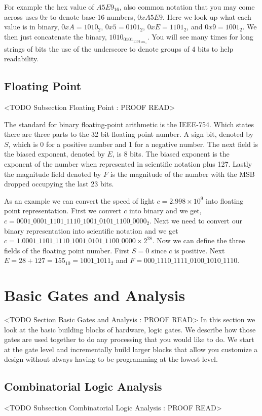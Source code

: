 For example the hex value of $A5E9_{16}$, also common notation that you may come across uses $0x$ to denote base-16 numbers, $0xA5E9$. Here we look up what each value is in binary, $0xA=1010_2$, $0x5=0101_2$, $0xE=1101_2$, and $0x9=1001_2$. We then just concatenate the binary, $1010_0101_1101_1001_2$. You will see many times for long strings of bits the use of the underscore to denote groups of 4 bits to help readability.	
		
\subsection{Floating Point}
	<TODO Subsection Floating Point : PROOF READ>
	
The standard for binary floating-point arithmetic is the \ac{IEEE}-754. Which states there are three parts to the 32 bit floating point number. A sign bit, denoted by $S$, which is 0 for a positive number and 1 for a negative number. The next field is the biased exponent, denoted by $E$, is 8 bits. The biased exponent is the exponent of the number when represented in scientific notation plus 127. Lastly the magnitude field denoted by $F$ is the magnitude of the number with the \ac{MSB} dropped occupying the last 23 bits.

As an example we can convert the speed of light $c = 2.998 \times 10^9$ into floating point representation. First we convert $c$ into binary and we get, $c=0001\_0001\_1101\_1110\_1001\_0101\_1100\_0000_2$. Next we need to convert our binary representation into scientific notation and we get $c=1.0001\_1101\_1110\_1001\_0101\_1100\_0000 \times 2^{28}$. Now we can define the three fields of the floating point number. First $S=0$ since $c$ is positive. Next $E=28+127=155_{10}=1001\_1011_2$ and $F=000\_1110\_1111\_0100\_1010\_1110$.


\section{Basic Gates and Analysis}
	<TODO Section Basic Gates and Analysis : PROOF READ>
In this section we look at the basic building blocks of hardware, logic gates. We describe how those gates are used together to do any processing that you would like to do. We start at the gate level and incrementally build larger blocks that allow you customize a design without always having to be programming at the lowest level.

\subsection{Combinatorial Logic Analysis}
	<TODO Subsection Combinatorial Logic Analysis : PROOF READ>

